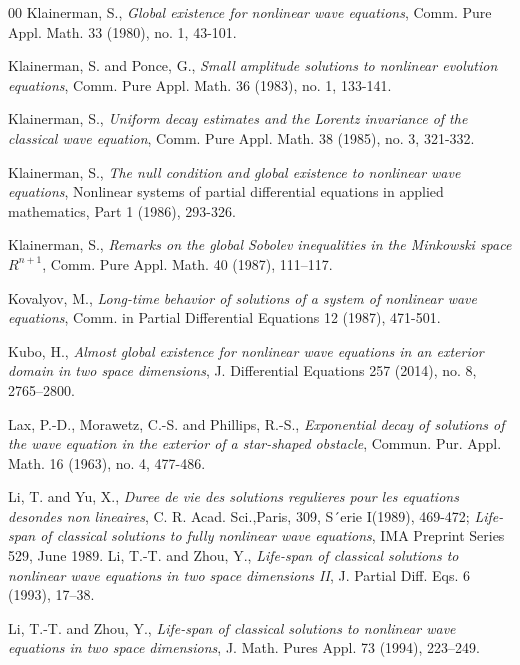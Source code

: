 \documentclass[11pt, reqno]{amsart}
\theoremstyle{definition}
\theoremstyle{remark}
\theoremstyle{definition}
\numberwithin{equation}{section}
\numberwithin{equation}{section}
\begin{document}
\begin{thebibliography}{00}
{Klainerman, S.}, \textit{\emph Global existence for nonlinear wave equations}, Comm. Pure Appl. Math. 33 (1980), no. 1, 43-101.


{Klainerman, S. and Ponce, G.}, \textit{\emph Small amplitude solutions to nonlinear evolution equations}, Comm. Pure Appl. Math. 36 (1983), no. 1, 133-141.


{Klainerman, S.}, \textit{\emph
Uniform decay estimates and the Lorentz invariance of the classical wave equation},
Comm. Pure Appl. Math. 38 (1985), no. 3, 321-332.


{Klainerman, S.}, \textit{\emph
The null condition and global existence to nonlinear wave equations}, Nonlinear
systems of partial differential equations in applied mathematics, Part 1 (1986), 293-326.


{Klainerman, S.}, \textit{\emph Remarks on the global Sobolev
inequalities in the Minkowski space $R^{n+1}$}, Comm. Pure Appl.
Math. 40 (1987), 111--117.

{Kovalyov, M.}, \textit{\emph Long-time behavior of solutions of a system of nonlinear wave equations}, Comm. in Partial Differential Equations 12 (1987), 
471-501.

{Kubo, H.}, \textit{\emph Almost global existence for nonlinear wave equations in an exterior domain in two space dimensions}, J. Differential Equations 257 
(2014), no. 8, 2765--2800.

{Lax, P.-D., Morawetz, C.-S. and Phillips, R.-S.}, \textit{\emph  Exponential decay of solutions of the wave equation in the exterior of a star-shaped 
obstacle}, Commun. Pur. Appl. Math. 16 (1963), no. 4, 477-486.

{Li, T. and Yu, X.}, \textit{\emph Duree de vie des solutions regulieres pour les equations desondes non lineaires}, C. R. Acad. Sci.,Paris, 309, S´erie 
I(1989), 469-472; 
\textit{\emph Life-span of classical solutions to fully nonlinear wave equations}, IMA Preprint Series 529, June
1989.
{Li, T.-T. and Zhou, Y.}, \textit{\emph  Life-span of classical
solutions to nonlinear wave equations in two space dimensions II},
J. Partial Diff. Eqs. 6 (1993), 17--38.

{Li, T.-T. and Zhou, Y.}, \textit{\emph Life-span of classical
solutions to nonlinear wave equations in two space dimensions}, J.
Math. Pures Appl. 73 (1994), 223--249.




\end{thebibliography}
\end{document}
